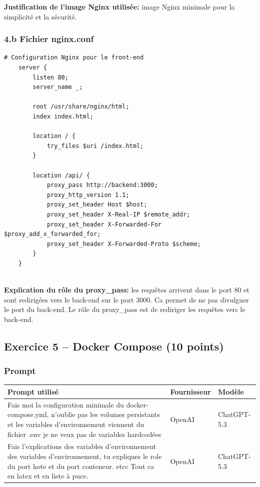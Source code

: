 \documentclass[11pt,a4paper]{article}
\begin{document}
\noindent\textbf{Justification de l'image Nginx utilisée:} image Nginx minimale pour la simplicité et la sécurité.

\subsubsection*{4.b Fichier nginx.conf}
\begin{lstlisting}[language={},title=frontend/nginx.conf]
# Configuration Nginx pour le front-end
    server {
        listen 80;
        server_name _;
    
        root /usr/share/nginx/html;
        index index.html;
    
        location / {
            try_files $uri /index.html;
        }
    
        location /api/ {
            proxy_pass http://backend:3000;
            proxy_http_version 1.1;
            proxy_set_header Host $host;
            proxy_set_header X-Real-IP $remote_addr;
            proxy_set_header X-Forwarded-For $proxy_add_x_forwarded_for;
            proxy_set_header X-Forwarded-Proto $scheme;
        }
    }
    
\end{lstlisting}

\noindent\textbf{Explication du rôle du proxy\_pass:} les requêtes arrivent dans le port 80 et sont redirigées vers le back-end sur le port 3000. Ca permet de ne pas divulguer le port du back-end. Le rôle du proxy\_pass est de rediriger les requêtes vers le back-end.

\newpage
\subsection{Exercice 5 -- Docker Compose (10 points)}
\subsubsection*{Prompt}
\begin{longtable}{p{}p{}p{}}
\toprule
Prompt utilisé & Fournisseur & Modèle \\
\midrule
Fais moi la configuration minimale du docker-compose.yml, n'oublie pas les volumes persistants et les variables d'environnement viennent du fichier .env je ne veux pas de variables hardcodées & OpenAI & ChatGPT-5.3 \\
Fais l'explications des variables d'environnement des variables d'environnement, tu expliques le role du port hote et du port conteneur. etcc Tout ca en latex et en liste à puce. & OpenAI & ChatGPT-5.3 \\
\bottomrule

\end{longtable}
\end{document}
